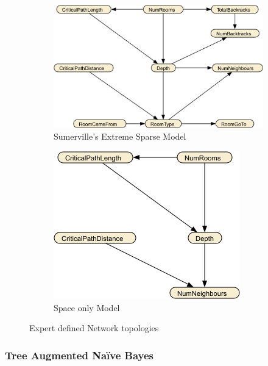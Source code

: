 \documentclass{UoYCSproject}
\begin{document}
\begin{figure}[htb]
  \centering
  \begin{subfigure}[b]{0.55\textwidth}
    \centering
    \includegraphics[width=\textwidth]{SESM_full.png}
    \caption{Sumerville's Extreme Sparse Model}
  \end{subfigure}
  \hfill
  \begin{subfigure}[b]{0.35\textwidth}
    \centering
    \includegraphics[width=\textwidth]{SESM_space.png}
    \caption{Space only Model}
  \end{subfigure}
  \caption{Expert defined Network topologies}
  \label{fig:SESM}
\end{figure}

\subsubsection{Tree Augmented Na\"{i}ve Bayes}
\end{document}
